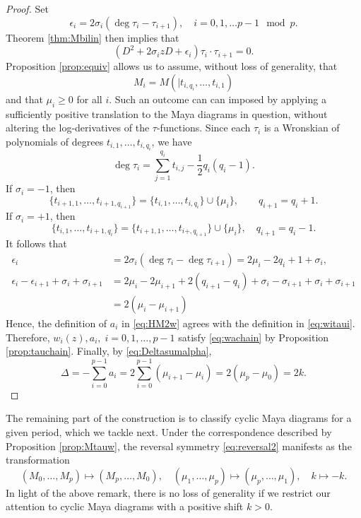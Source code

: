 \documentclass{amsart}
\theoremstyle{definition}
\begin{document}
\begin{proof}
  Set
  \[ \epsilon_i = 2\sigma_i (\deg \tau_{i} - \tau_{i+1}),\quad
    i=0,1,\ldots p-1\mod p.\] Theorem \ref{thm:Mbilin} then implies
  that
  \[ (D^2+2\sigma_iz D + \epsilon_i) \tau_i \cdot \tau_{i+1} = 0.\]
  Proposition \ref{prop:equiv} allows us to assume, without loss of
  generality, that
  \[ M_i = M(\mid t_{i,q_i},\ldots, t_{i,1}) \] and that
  $\mu_i \geq 0$ for all $i$.  Such an outcome can can imposed by
  applying a sufficiently positive translation to the Maya diagrams in
  question, without altering the log-derivatives of the
  $\tau$-functions.  Since each $\tau_i$ is a Wronskian of polynomials
  of degrees $t_{i,1},\ldots, t_{i,q_i}$, we have
  \[ \deg \tau_i = \sum_{j=1}^{q_i} t_{i,j} - \frac12 q_i(q_i-1).\]
  If $\sigma_i=-1$, then
  \[ \{ t_{i+1,1},\ldots, t_{i+1,q_{i+1}} \} = \{ t_{i,1},\ldots ,
    t_{i,q_i} \} \cup \{ \mu_i \},\qquad q_{i+1} = q_i+1.\]
  If $\sigma_i=+1$, then
  \[ \{ t_{i,1},\ldots, t_{i+1,q_{i}} \} = \{ t_{i+1,1},\ldots ,
    t_{i+,q_{i+1}} \} \cup \{ \mu_i \},\quad q_{i+1} = q_i-1.
 \]
  It follows that
  \begin{align*}
    \epsilon_i&=2\sigma_i (\deg \tau_{i} - \deg \tau_{i+1}) = 2\mu_i -
    2q_i + 1+\sigma_i,\\
    \epsilon_i- \epsilon_{i+1} + \sigma_i + \sigma_{i+1} &= 2\mu_i-2\mu_{i+1}+2(q_{i+1}-q_i)+\sigma_i-\sigma_{i+1}+\sigma_i+\sigma_{i+1}\\
     &=  2(\mu_i-\mu_{i+1})
  \end{align*}
  Hence, the definition of $a_i$ in \eqref{eq:HM2w} agrees with the
  definition in \eqref{eq:witaui}.  Therefore,
  $w_i(z), a_i,\; i=0,1,\ldots, p-1$ satisfy \eqref{eq:wachain} by
  Proposition \ref{prop:tauchain}. Finally, by \eqref{eq:Deltasumalpha},
  \[ \Delta = -\sum_{i=0}^{p-1} a_i = 2\sum_{i=0}^{p-1}
    (\mu_{i+1}-\mu_{i}) = 2(\mu_p - \mu_0) = 2k. \]
\end{proof}

The remaining part of the construction is to classify cyclic Maya
diagrams for a given period, which we tackle next.  Under the
correspondence described by Proposition \ref{prop:Mtauw}, the reversal
symmetry \eqref{eq:reversal2} manifests as the transformation
\[ (M_0,\ldots, M_p) \mapsto (M_p,\ldots, M_0),\quad (\mu_1,\ldots,
\mu_{p}) \mapsto (\mu_{p},\ldots, \mu_1),\quad k\mapsto -k.\]
In light of the above remark, there is no loss of generality if we
restrict our attention to cyclic Maya diagrams with a positive shift
$k>0$.
\end{document}

